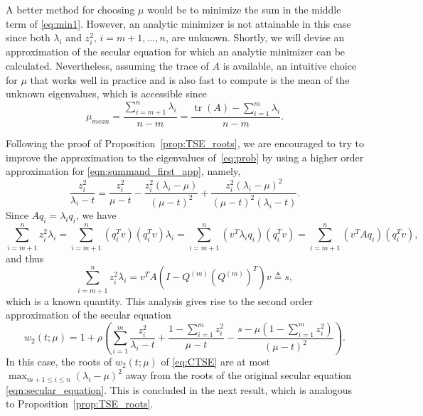 \documentclass[11pt]{article}
\begin{document}
A better method for choosing $\mu$ would be to minimize the sum in the middle term of \eqref{eq:min1}. However, an analytic minimizer is not attainable in this case since both $\lambda_i$ and $z_i^2$, $i = m+1,...,n$, are unknown. Shortly, we will devise an approximation of the secular equation for which an analytic minimizer can be calculated. Nevertheless, assuming the trace of $A$ is available, an intuitive choice for $\mu$ that works well in practice and is also fast to compute is the mean of the unknown eigenvalues, which is accessible since 
\begin{equation} \label{eq:mu_mean}
\mu_{mean} = \frac{\sum_{i=m+1}^n \lambda_i}{n-m} = \frac{\operatorname{tr}(A) - \sum_{i=1}^{m} \lambda_i}{n - m} .
\end{equation}

Following the proof of Proposition~\ref{prop:TSE_roots}, we are encouraged to try to improve the approximation to the eigenvalues of~\eqref{eq:prob} by using a higher order approximation for \eqref{eqn:summand_first_app}, namely,
\begin{equation} \label{eqn:ImprovedExpansion}
  \frac{z_i^2}{\lambda_i - t} = \frac{z_i^2}{\mu-t} -  \frac{z_i^2(\lambda_i - \mu)}{(\mu-t)^2} + \frac{z_i^2(\lambda_i - \mu)^2}{(\mu - t)^2(\lambda_i - t)} .
\end{equation}
Since $Aq_i = \lambda_i q_i$, we have
\begin{equation}
\sum_{i=m+1}^{n}z_i^2\lambda_i = \sum_{i=m+1}^{n}(q_i^Tv)(q_i^Tv)\lambda_i = \sum_{i=m+1}^{n}(v^T\lambda_iq_i)(q_i^Tv) = \sum_{i=m+1}^{n}(v^TAq_i)(q_i^Tv) ,
\end{equation}
and thus
\begin{equation} \label{eq:s}
\sum_{i=m+1}^{n}z_i^2\lambda_i = v^TA \left( I - Q^{(m)} (Q^{(m)})^T \right) v \triangleq s ,
\end{equation}
which is a known quantity. This analysis gives rise to the second order approximation of the secular equation
\begin{equation} \label{eq:CTSE}
w_{2}(t ; \mu) = 1 + \rho \left( \sum_{i=1}^{m} {\frac{z_i^2}{\lambda_i - t}} +  \frac{1 - \sum_{i=1}^{m}{z_i^2}}{\mu-t} - \frac{s - \mu (1 - \sum_{i=1}^{m}{z_i^2})}{(\mu - t)^2} \right) .
\end{equation}
In this case, the roots of $w_{2}(t ; \mu)$ of \eqref{eq:CTSE} are at most $\max_{m+1 \leq i \leq n} (\lambda_i -\mu)^2 $ away from the roots of the original secular equation \eqref{eqn:secular_equation}. This is concluded in the next result, which is analogous to Proposition~\ref{prop:TSE_roots}.
\end{document}

